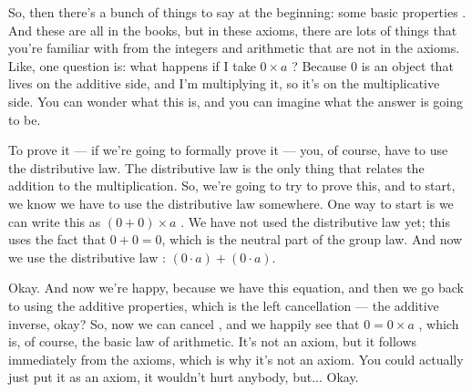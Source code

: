 \begin{speech}[00:09:45 - 00:11:32]
So, then there's a bunch of things to say at the beginning: some basic properties . And these are all in the books, but in these axioms, there are lots of things that you're familiar with from the integers and arithmetic that are not in the axioms. Like, one question is: what happens if I take $0 \times a$ ? Because $0$ is an object that lives on the additive side, and I'm multiplying it, so it's on the multiplicative side. You can wonder what this is, and you can imagine what the answer is going to be.

To prove it --- if we're going to formally prove it --- you, of course, have to use the distributive law. The distributive law is the only thing that relates the addition to the multiplication. So, we're going to try to prove this, and to start, we know we have to use the distributive law somewhere. One way to start is we can write this as $(0 + 0) \times a$ . We have not used the distributive law yet; this uses the fact that $0 + 0 = 0$, which is the neutral part of the group law. And now we use the distributive law : $(0 \cdot a) + (0 \cdot a)$.

Okay. And now we're happy, because we have this equation, and then we go back to using the additive properties, which is the left cancellation --- the additive inverse, okay? So, now we can cancel , and we happily see that $0 = 0 \times a$ , which is, of course, the basic law of arithmetic. It's not an axiom, but it follows immediately from the axioms, which is why it's not an axiom. You could actually just put it as an axiom, it wouldn't hurt anybody, but... Okay.
\end{speech}

